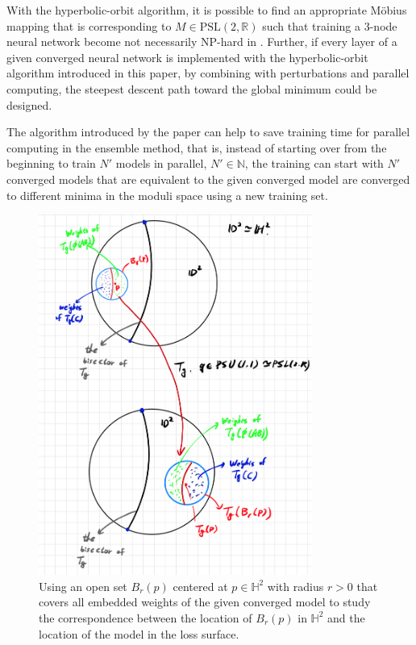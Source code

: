 \documentclass{article}
\theoremstyle{plain}
\theoremstyle{plain} %
\theoremstyle{definition}  %
\theoremstyle{remark}  %
\theoremstyle{plain}
\begin{document}
With the hyperbolic-orbit algorithm, it is possible to find an appropriate M\"{o}bius mapping that is corresponding to $M\in\text{PSL}(2,\mathbb{R})$ such that training a 3-node neural network become not necessarily NP-hard in \cite{blum1988training}. Further, if every layer of a given converged neural network is implemented with the hyperbolic-orbit algorithm introduced in this paper, by combining with perturbations and parallel computing, the steepest descent path toward the global minimum could be designed.

The algorithm introduced by the paper can help to save training time for parallel computing in the ensemble method, that is, instead of starting over from the beginning to train $N'$ models in parallel, $N'\in\mathbb{N}$, the training can start with $N'$ converged models that are equivalent to the given converged model are converged to different minima in the moduli space using a new training set.

\begin{figure}[H]
\centering
\includegraphics[width=0.8\textwidth]{10.png}
\caption{Using an open set $B_r(p)$ centered at $p\in\mathbb{H}^2$ with radius $r>0$ that covers all embedded weights of the given converged model to study the correspondence between the location of $B_r(p)$ in $\mathbb{H}^2$ and the location of the model in the loss surface.}
\end{figure}
\end{document}
